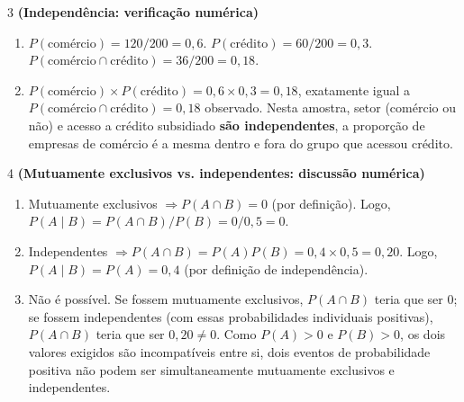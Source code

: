 \documentclass[11pt]{article}
\begin{document}
\begin{questao}{3} \textbf{(Independência: verificação numérica)}
\begin{solucao}
\begin{enumerate}[label=(\alph*)]
  \item $P(\text{comércio}) = 120/200 = 0{,}6$. $P(\text{crédito}) = 60/200 = 0{,}3$.
    $P(\text{comércio}\cap\text{crédito}) = 36/200 = 0{,}18$.
  \item $P(\text{comércio})\times P(\text{crédito}) = 0{,}6\times 0{,}3 = 0{,}18$, exatamente igual
    a $P(\text{comércio}\cap\text{crédito})=0{,}18$ observado. Nesta amostra, setor (comércio ou
    não) e acesso a crédito subsidiado \textbf{são independentes}, a proporção de empresas de
    comércio é a mesma dentro e fora do grupo que acessou crédito.
\end{enumerate}
\end{solucao}
\end{questao}

\begin{questao}{4} \textbf{(Mutuamente exclusivos vs. independentes: discussão numérica)}
\begin{solucao}
\begin{enumerate}[label=(\alph*)]
  \item Mutuamente exclusivos $\Rightarrow P(A\cap B)=0$ (por definição). Logo,
    $P(A\mid B) = P(A\cap B)/P(B) = 0/0{,}5 = 0$.
  \item Independentes $\Rightarrow P(A\cap B) = P(A)P(B) = 0{,}4\times 0{,}5 = 0{,}20$. Logo,
    $P(A\mid B) = P(A) = 0{,}4$ (por definição de independência).
  \item Não é possível. Se fossem mutuamente exclusivos, $P(A\cap B)$ teria que ser $0$; se fossem
    independentes (com essas probabilidades individuais positivas), $P(A\cap B)$ teria que ser
    $0{,}20 \ne 0$. Como $P(A)>0$ e $P(B)>0$, os dois valores exigidos são incompatíveis entre si, dois eventos de probabilidade positiva não podem ser simultaneamente mutuamente exclusivos e
    independentes.
\end{enumerate}
\end{solucao}
\end{questao}
\end{document}

